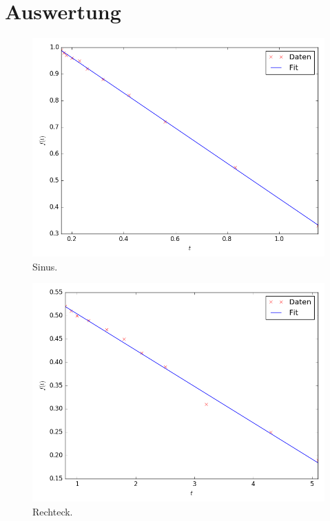 \section{Auswertung}
\label{sec:Auswertung}

\begin{figure}
  \centering
  \includegraphics[width=\linewidth,height=\textheight,keepaspectratio]{Sinus.png}
  \caption{Sinus.}
  \label{fig:Sinus}
\end{figure}


\begin{figure}
	\centering
	\includegraphics[width=\linewidth,height=\textheight,keepaspectratio]{Rechteck.png}
	\caption{Rechteck.}
	\label{fig:Rechteck}
\end{figure}


